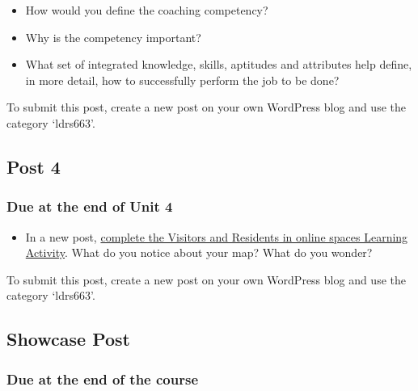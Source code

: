 \documentclass[
]{book}
\providecommand{\tightlist}{%
  \setlength{\itemsep}{0pt}\setlength{\parskip}{0pt}}
\begin{document}
\begin{itemize}
\tightlist
\item
  How would you define the coaching competency?\\
\item
  Why is the competency important?\\
\item
  What set of integrated knowledge, skills, aptitudes and attributes help define, in more detail, how to successfully perform the job to be done?
\end{itemize}

To submit this post, create a new post on your own WordPress blog and use the category `ldrs663'.

\hypertarget{post-4}{%
\subsection*{Post 4}\label{post-4}}

\hypertarget{due-at-the-end-of-unit-4}{%
\subsubsection*{Due at the end of Unit 4}\label{due-at-the-end-of-unit-4}}

\begin{itemize}
\tightlist
\item
  In a new post, \href{https://ma-lead.github.io/ldrs663/building-the-web.html\#learning-activity}{complete the Visitors and Residents in online spaces Learning Activity}. What do you notice about your map? What do you wonder?
\end{itemize}

To submit this post, create a new post on your own WordPress blog and use the category `ldrs663'.

\hypertarget{showcase-post}{%
\subsection*{Showcase Post}\label{showcase-post}}

\hypertarget{due-at-the-end-of-the-course}{%
\subsubsection*{Due at the end of the course}\label{due-at-the-end-of-the-course}}
\end{document}
